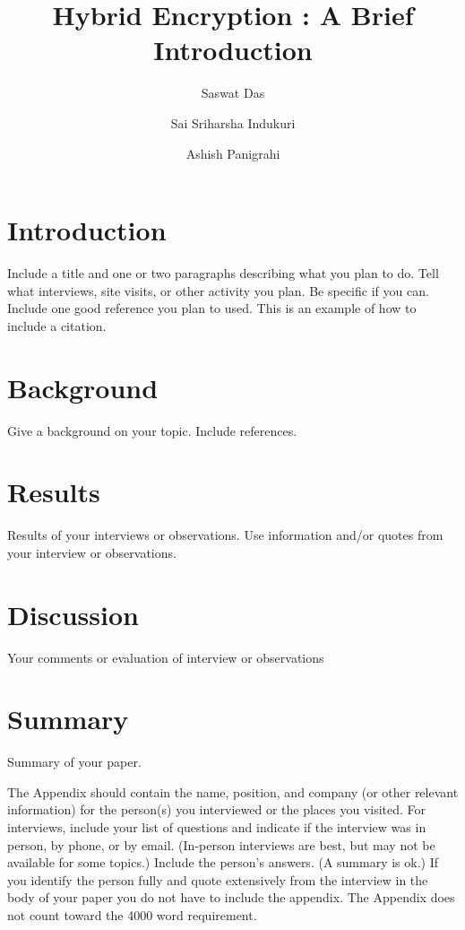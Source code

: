 \documentclass[journal]{IEEEtran}
\begin{document}
\title{Hybrid Encryption : A Brief Introduction}

\author[1]{Saswat Das}%
\author[2]{Sai Sriharsha Indukuri}
\author[3]{Ashish Panigrahi}%

\maketitle


\section{Introduction }
Include a title and one or two paragraphs describing what you plan to do. Tell what interviews, site visits, or other activity you plan. Be specific if you can. Include  one good reference you plan to used. This is an example of how to include a citation.

\section{Background}
Give a background on your topic. Include references.

\section{Results}
Results of your interviews or observations. Use information and/or quotes from your interview or observations.

\section{Discussion}
Your comments or evaluation of interview or observations

\section{Summary}
Summary of your paper.

\appendix
The Appendix should contain the name, position, and company (or other relevant information) for the person(s) you interviewed or the places you visited.
For interviews, include your list of questions and indicate if the interview was in person, by phone, or by email.
(In-person interviews are best, but may not be available for some topics.) Include the person's answers.
(A summary is ok.) If you identify the person fully and quote extensively from the interview in the body of your paper you do not have to include the appendix.
The Appendix does not count toward the 4000 word requirement.
\end{document}
